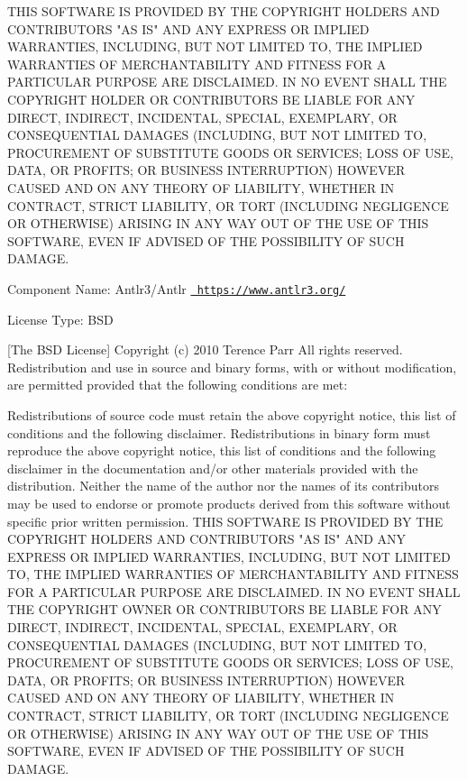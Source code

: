 THIS SOFTWARE IS PROVIDED BY THE COPYRIGHT HOLDERS AND CONTRIBUTORS "{}\+AS IS"{} AND ANY EXPRESS OR IMPLIED WARRANTIES, INCLUDING, BUT NOT LIMITED TO, THE IMPLIED WARRANTIES OF MERCHANTABILITY AND FITNESS FOR A PARTICULAR PURPOSE ARE DISCLAIMED. IN NO EVENT SHALL THE COPYRIGHT HOLDER OR CONTRIBUTORS BE LIABLE FOR ANY DIRECT, INDIRECT, INCIDENTAL, SPECIAL, EXEMPLARY, OR CONSEQUENTIAL DAMAGES (INCLUDING, BUT NOT LIMITED TO, PROCUREMENT OF SUBSTITUTE GOODS OR SERVICES; LOSS OF USE, DATA, OR PROFITS; OR BUSINESS INTERRUPTION) HOWEVER CAUSED AND ON ANY THEORY OF LIABILITY, WHETHER IN CONTRACT, STRICT LIABILITY, OR TORT (INCLUDING NEGLIGENCE OR OTHERWISE) ARISING IN ANY WAY OUT OF THE USE OF THIS SOFTWARE, EVEN IF ADVISED OF THE POSSIBILITY OF SUCH DAMAGE.

 Component Name\+: Antlr3/\+Antlr \href{https://www.antlr3.org/}{\texttt{ https\+://www.\+antlr3.\+org/}}

License Type\+: BSD

\mbox{[}The BSD License\mbox{]} Copyright (c) 2010 Terence Parr All rights reserved. Redistribution and use in source and binary forms, with or without modification, are permitted provided that the following conditions are met\+:

Redistributions of source code must retain the above copyright notice, this list of conditions and the following disclaimer. Redistributions in binary form must reproduce the above copyright notice, this list of conditions and the following disclaimer in the documentation and/or other materials provided with the distribution. Neither the name of the author nor the names of its contributors may be used to endorse or promote products derived from this software without specific prior written permission. THIS SOFTWARE IS PROVIDED BY THE COPYRIGHT HOLDERS AND CONTRIBUTORS "{}\+AS IS"{} AND ANY EXPRESS OR IMPLIED WARRANTIES, INCLUDING, BUT NOT LIMITED TO, THE IMPLIED WARRANTIES OF MERCHANTABILITY AND FITNESS FOR A PARTICULAR PURPOSE ARE DISCLAIMED. IN NO EVENT SHALL THE COPYRIGHT OWNER OR CONTRIBUTORS BE LIABLE FOR ANY DIRECT, INDIRECT, INCIDENTAL, SPECIAL, EXEMPLARY, OR CONSEQUENTIAL DAMAGES (INCLUDING, BUT NOT LIMITED TO, PROCUREMENT OF SUBSTITUTE GOODS OR SERVICES; LOSS OF USE, DATA, OR PROFITS; OR BUSINESS INTERRUPTION) HOWEVER CAUSED AND ON ANY THEORY OF LIABILITY, WHETHER IN CONTRACT, STRICT LIABILITY, OR TORT (INCLUDING NEGLIGENCE OR OTHERWISE) ARISING IN ANY WAY OUT OF THE USE OF THIS SOFTWARE, EVEN IF ADVISED OF THE POSSIBILITY OF SUCH DAMAGE.


